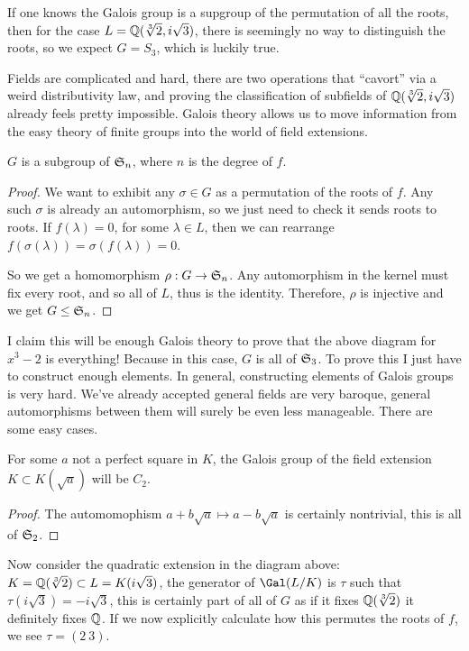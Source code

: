\documentclass{article}
\begin{document}
If one knows the Galois group is a supgroup of the permutation of all the roots, then for the case $L=\mathbb{Q}(\sqrt[3]{2},i\sqrt{3})$, there is seemingly no way to distinguish the roots, so we expect $G=S_3$, which is luckily true.

Fields are complicated and hard, there are two operations that ``cavort'' via a weird distributivity law, and proving the classification of subfields of $\mathbb{Q}(\sqrt[3]{2},i\sqrt{3})$ already feels pretty impossible. Galois theory allows us to move information from the easy theory of finite groups into the world of field extensions.

\begin{proposition}
    $G$ is a subgroup of $\mathfrak{S}_n$, where $n$ is the degree of $f$.
    \begin{proof}
        We want to exhibit any $\sigma\in G$ as a permutation of the roots of $f$.
        Any such $\sigma$ is already an automorphism, so we just need to check it sends roots to roots. If $f(\lambda)=0$, for some $\lambda \in L$, then we can rearrange $f(\sigma(\lambda)) = \sigma(f(\lambda)) = 0$.

        So we get a homomorphism $\rho : G \rightarrow \mathfrak{S}_n$. Any automorphism in the kernel must fix every root, and so all of $L$, thus is the identity. Therefore, $\rho$ is injective and we get $G\leq \mathfrak{S}_n$.
    \end{proof}
\end{proposition}

I claim this will be enough Galois theory to prove that the above diagram for $x^3-2$ is everything! Because in this case, $G$ is all of $\mathfrak{S}_3$. To prove this I just have to construct enough elements. In general, constructing elements of Galois groups is very hard. We've already accepted general fields are very baroque, general automorphisms between them will surely be even less manageable. There are some easy cases.

\begin{proposition}
    For some $a$ not a perfect square in $K$, the Galois group of the field extension $K\subset K(\sqrt{a})$ will be $C_2$.
    \begin{proof}
        The automomophism $a+b\sqrt{a}\mapsto a-b\sqrt{a}$ is certainly nontrivial, this is all of $\mathfrak{S}_2$.
    \end{proof}
\end{proposition}

Now consider the quadratic extension in the diagram above: $K=\mathbb{Q}(\sqrt[3]{2})\subset L = K(i\sqrt{3})$, the generator of $\Gal(L/K)$ is $\tau$ such that $\tau(i\sqrt{3}) = -i\sqrt{3}$, this is certainly part of all of $G$ as if it fixes $\mathbb{Q}(\sqrt[3]{2})$ it definitely fixes $\mathbb{Q}$. If we now explicitly calculate how this permutes the roots of $f$, we see $\tau = (2 \ 3)$.
\end{document}
